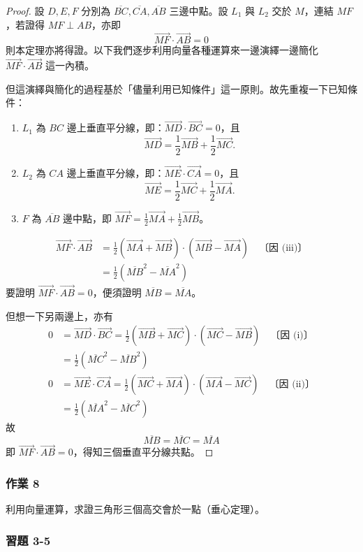\begin{proof}
設 $D, E, F$ 分別為 $\overline{BC}, \overline{CA}, \overline{AB}$ 三邊中點。設 $L_1$ 與 $L_2$ 交於 $M$，連結 $MF$，若證得 $MF \perp AB$，亦即
\[ \vec{MF}\cdot\vec{AB} = 0 \]
則本定理亦將得證。以下我們逐步利用向量各種運算來一邊演繹一邊簡化 $\vec{MF}\cdot\vec{AB}$ 這一內積。

但這演繹與簡化的過程基於「儘量利用已知條件」這一原則。故先重複一下已知條件：
\begin{enumerate}[label=(\roman*), leftmargin=2.5em]
  \item $L_1$ 為 $BC$ 邊上垂直平分線，即：$\vec{MD}\cdot\vec{BC} = 0$，且
  \[ \vec{MD} = \frac{1}{2}\vec{MB} + \frac{1}{2}\vec{MC}. \]
  \item $L_2$ 為 $CA$ 邊上垂直平分線，即：$\vec{ME}\cdot\vec{CA} = 0$，且
  \[ \vec{ME} = \frac{1}{2}\vec{MC} + \frac{1}{2}\vec{MA}. \]
  \item $F$ 為 $\overline{AB}$ 邊中點，即 $\vec{MF} = \frac{1}{2}\vec{MA} + \frac{1}{2}\vec{MB}$。
\end{enumerate}
\begin{align*}
\vec{MF}\cdot\vec{AB} &= \frac{1}{2}(\vec{MA} + \vec{MB})\cdot(\vec{MB} - \vec{MA}) \quad \text{〔因 (iii)〕} \\
&= \frac{1}{2}(\overline{MB}^2 - \overline{MA}^2)
\end{align*}
要證明 $\vec{MF}\cdot\vec{AB} = 0$，便須證明 $\overline{MB} = \overline{MA}$。

但想一下另兩邊上，亦有
\begin{align*}
0 &= \vec{MD}\cdot\vec{BC} = \frac{1}{2}(\vec{MB} + \vec{MC})\cdot(\vec{MC} - \vec{MB}) \quad \text{〔因 (i)〕} \\
&= \frac{1}{2}(\overline{MC}^2 - \overline{MB}^2) \\
0 &= \vec{ME}\cdot\vec{CA} = \frac{1}{2}(\vec{MC} + \vec{MA})\cdot(\vec{MA} - \vec{MC}) \quad \text{〔因 (ii)〕} \\
&= \frac{1}{2}(\overline{MA}^2 - \overline{MC}^2)
\end{align*}
故
\[ \overline{MB} = \overline{MC} = \overline{MA} \]
即 $\vec{MF}\cdot\vec{AB} = 0$，得知三個垂直平分線共點。\qedhere
\end{proof}

\subsubsection*{作業 8}
利用向量運算，求證三角形三個高交會於一點（垂心定理）。

\subsubsection*{習題 3-5}

